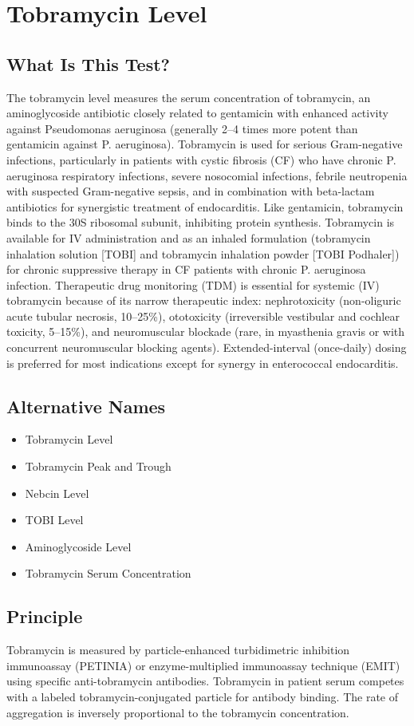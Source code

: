 \chapter{Tobramycin Level}

\section*{What Is This Test?}
The tobramycin level measures the serum concentration of tobramycin, an aminoglycoside antibiotic closely related to gentamicin with enhanced activity against Pseudomonas aeruginosa (generally 2--4 times more potent than gentamicin against P. aeruginosa). Tobramycin is used for serious Gram-negative infections, particularly in patients with cystic fibrosis (CF) who have chronic P. aeruginosa respiratory infections, severe nosocomial infections, febrile neutropenia with suspected Gram-negative sepsis, and in combination with beta-lactam antibiotics for synergistic treatment of endocarditis. Like gentamicin, tobramycin binds to the 30S ribosomal subunit, inhibiting protein synthesis. Tobramycin is available for IV administration and as an inhaled formulation (tobramycin inhalation solution [TOBI] and tobramycin inhalation powder [TOBI Podhaler]) for chronic suppressive therapy in CF patients with chronic P. aeruginosa infection. Therapeutic drug monitoring (TDM) is essential for systemic (IV) tobramycin because of its narrow therapeutic index: nephrotoxicity (non-oliguric acute tubular necrosis, 10--25\%), ototoxicity (irreversible vestibular and cochlear toxicity, 5--15\%), and neuromuscular blockade (rare, in myasthenia gravis or with concurrent neuromuscular blocking agents). Extended-interval (once-daily) dosing is preferred for most indications except for synergy in enterococcal endocarditis.

\section*{Alternative Names}
\begin{itemize}
  \item Tobramycin Level
  \item Tobramycin Peak and Trough
  \item Nebcin Level
  \item TOBI Level
  \item Aminoglycoside Level
  \item Tobramycin Serum Concentration
\end{itemize}
\section*{Principle}
Tobramycin is measured by particle-enhanced turbidimetric inhibition immunoassay (PETINIA) or enzyme-multiplied immunoassay technique (EMIT) using specific anti-tobramycin antibodies. Tobramycin in patient serum competes with a labeled tobramycin-conjugated particle for antibody binding. The rate of aggregation is inversely proportional to the tobramycin concentration.

